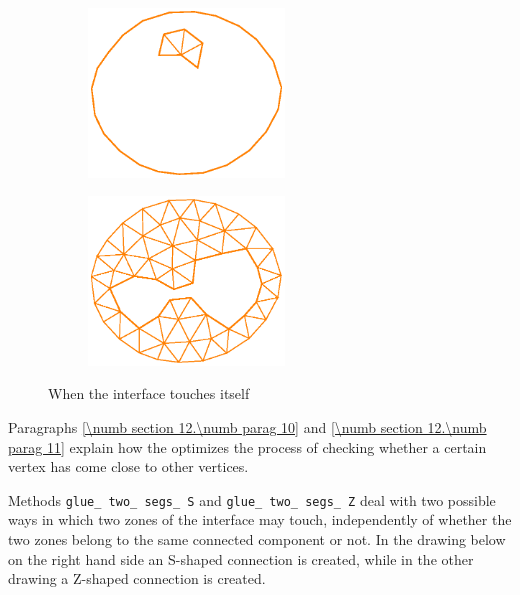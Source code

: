 \begin{figure}[ht] \centering
\begin{subfigure}{65mm}\centering
  \includegraphics[width=52mm]{touching-interf-1}
\end{subfigure}  
\begin{subfigure}{65mm}\centering
  \includegraphics[width=52mm]{touching-interf-2}
\end{subfigure}  
  \caption{When the interface touches itself}
  \label{\numb section 12.\numb fig 7}
\end{figure}

Paragraphs \ref{\numb section 12.\numb parag 10} and \ref{\numb section 12.\numb parag 11}
explain how the {\small\tt{}} optimizes the process of checking whether a
certain vertex has come close to other vertices.

Methods {\small\tt glue\_\,two\_\,segs\_\,S} and
{\small\tt glue\_\,two\_\,segs\_\,Z} deal with two possible ways in which two
zones of the interface may touch,
independently of whether the two zones belong to the same connected component or not.
In the drawing below on the right hand side an S-shaped connection is created,
while in the other drawing a Z-shaped connection is created.

